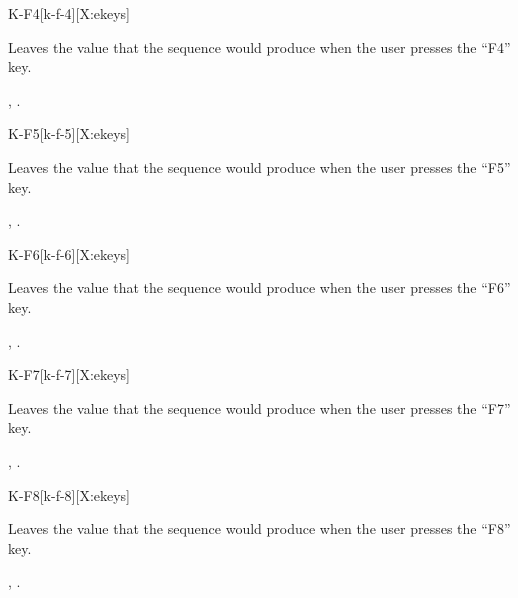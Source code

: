 \begin{worddef}{}{K-F4}[k-f-4][X:ekeys]
\item {}

	Leaves the value  that the sequence 
	 would produce when the user presses the
	``F4'' key.

\see {},
	.
\end{worddef}


\begin{worddef}{}{K-F5}[k-f-5][X:ekeys]
\item {}

	Leaves the value  that the sequence 
	 would produce when the user presses the
	``F5'' key.

\see {},
	.
\end{worddef}


\begin{worddef}{}{K-F6}[k-f-6][X:ekeys]
\item {}

	Leaves the value  that the sequence 
	 would produce when the user presses the
	``F6'' key.

\see {},
	.
\end{worddef}


\begin{worddef}{}{K-F7}[k-f-7][X:ekeys]
\item {}

	Leaves the value  that the sequence 
	 would produce when the user presses the
	``F7'' key.

\see {},
	.
\end{worddef}


\begin{worddef}{}{K-F8}[k-f-8][X:ekeys]
\item {}

	Leaves the value  that the sequence 
	 would produce when the user presses the
	``F8'' key.

\see {},
	.
\end{worddef}


